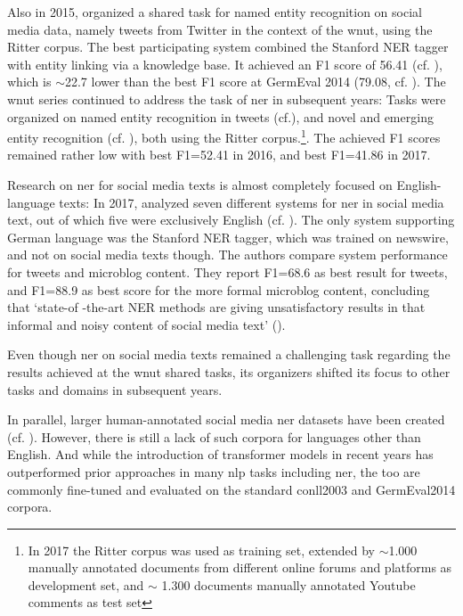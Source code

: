 Also in 2015, \citeauthor{baldwin_shared_2015} organized a shared task for named entity recognition on social media data, namely tweets from Twitter in the context of the \gls{wnut}, using the Ritter corpus. The best participating system combined the Stanford NER tagger with entity linking via a knowledge base. It achieved an F1 score of 56.41 (cf. \cite{baldwin_shared_2015}), which is $\sim$22.7 lower than the best F1 score at GermEval 2014 (79.08, cf. \cite{benikova2014germeval}). 
The \gls{wnut} series continued to address the task of \gls{ner} in subsequent years: Tasks were organized on named entity recognition in tweets (cf.\cite{strauss_results_2016}), and novel and emerging entity recognition (cf. \cite{derczynski_results_2017}), both using the Ritter corpus.\footnote{In 2017 the Ritter corpus was used as training set, extended by $\sim$1.000 manually annotated documents from different online forums and platforms as development set, and $\sim$ 1.300 documents manually annotated Youtube comments as test set}. The achieved F1 scores remained rather low with best F1=52.41 in 2016, and best F1=41.86 in 2017. 

Research on \gls{ner} for social media texts is almost completely focused on English-language texts: In 2017, \citeauthor{bhoi_2017} analyzed seven different systems for \gls{ner} in social media text, out of which five were exclusively English (cf. \cite{bhoi_2017}). The only system supporting German language was the Stanford NER tagger, which was trained on newswire, and not on social media texts though. The authors compare system performance for tweets and microblog content. They report F1=68.6 as best result for tweets, and F1=88.9 as best score for the more formal microblog content, concluding that `state-of -the-art NER methods are giving unsatisfactory results in that informal and noisy content of social media text' (\cite{bhoi_2017}).

Even though \gls{ner} on social media texts remained a challenging task regarding the results achieved at the \gls{wnut} shared tasks, its organizers shifted its focus to other tasks and domains in subsequent years. 

In parallel, larger human-annotated social media \gls{ner} datasets have been created (cf. \cite{derczynski-etal-2016-broad}). However, there is still a lack of such corpora for languages other than English. And while the introduction of transformer models in recent years has outperformed prior approaches in many \gls{nlp} tasks including \gls{ner}, the too are commonly fine-tuned and evaluated on the standard \gls{conll}2003 and GermEval2014 corpora. 